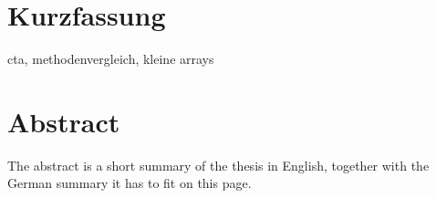 \thispagestyle{plain}

\section*{Kurzfassung}
cta, methodenvergleich, kleine arrays

\section*{Abstract}
\begin{english}
The abstract is a short summary of the thesis in English, together with the German summary it has to fit on this page.
\end{english}
